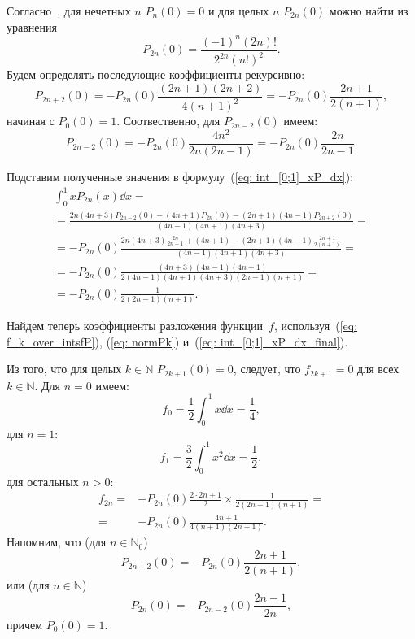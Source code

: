 	Согласно~\cite[ур-е 18]{LegendreRochester}, для нечетных $n$  $P_n(0)=0$ и для целых $n$ $P_{2n}(0)$ можно найти из уравнения
	\begin{equation} 
		P_{2n}(0) = \frac{{(-1)}^n (2n)!}{2^{2n}{(n!)}^2}.
	\end{equation}
Будем определять последующие коэффициенты рекурсивно:
	\begin{equation} 
	\label{eq: P_2n+2_recursively}
	P_{2n+2}(0) = - P_{2n}(0) \frac{(2n+1)(2n+2)}{4(n+1)^2} = - P_{2n}(0) \frac{2n+1}{2(n+1)},
	\end{equation}
	начиная с $P_{0}(0)=1$.
	Соотвественно, для 	$P_{2n-2}(0)$ имеем:
	\begin{equation} 
	P_{2n-2}(0) = - P_{2n}(0) \frac{4n^2}{2n(2n-1)} = - P_{2n}(0) \frac{2n}{2n-1} .
	\end{equation}
	
	Подставим полученные значения в формулу~(\ref{eq: int_[0;1]_xP_dx}):
	\begin{multline}	
	\label{eq: int_[0;1]_xP_dx_final}
		\int_{0}^{1}{x P_{2n} (x) \dd{x}} = \\ 
		= \frac{2n(4n+3)P_{2n-2}(0)-(4n+1)P_{2n}(0)-(2n+1)(4n-1)P_{2n+2}(0)}{(4n-1)(4n+1)(4n+3)} = \\
		= - P_{2n}(0) \frac{2n(4n+3)\frac{2n}{2n-1}+(4n+1)-(2n+1)(4n-1)\frac{2n+1}{2(n+1)}}{(4n-1)(4n+1)(4n+3)} = \\
		= -  P_{2n}(0) \frac{(4n+3)(4n-1)(4n+1)}{2(4n-1)(4n+1)(4n+3)(2n-1)(n+1)} = \\
		= -  P_{2n}(0) \frac{1}{2(2n-1)(n+1)}.
	\end{multline} 
	
	Найдем теперь коэффициенты разложения функции~$f$, используя~(\ref{eq: f_k_over_intsfP}), (\ref{eq: normPk}) и~(\ref{eq: int_[0;1]_xP_dx_final}). 
	
	Из того, что для целых $k \in \mathbb{N}$ $P_{2k+1}(0)=0$, следует, что $f_{2k+1}=0$ для всех $k \in \mathbb{N}$. Для $n=0$ имеем: 
	\begin{equation} 
	f_0 = \frac{1}{2}\int_{0}^{1}{x\dd{x}} = \frac{1}{4},
	\end{equation} 
	для $n=1$:
	\begin{equation} 
	f_1 = \frac{3}{2} \int_{0}^{1}{x^2\dd{x}} = \frac{1}{2},
	\end{equation} 
	 для остальных $n>0$:
	\begin{equation}
	\label{eq: f_n_simple} 
	\begin{split}
	f_{2n} =& -P_{2n}(0)\frac{2 \cdot 2n+1}{2}\times\frac{1}{2(2n-1)(n+1)} = \\ 
	  = &	-P_{2n}(0)\frac{4n+1}{4(n+1)(2n-1)}.
	\end{split}
	\end{equation}
	Напомним, что (для $n \in \mathbb{N}_0$)
	\begin{equation} 
	\label{eq: P_2n+2_recursively}
	P_{2n+2}(0) = - P_{2n}(0) \frac{2n+1}{2(n+1)},
	\end{equation} 
	или (для $n \in \mathbb{N}$)
	\begin{equation} 
	\label{eq: P_2n_recursively}
	P_{2n}(0) = - P_{2n-2}(0) \frac{2n-1}{2n}, 
	\end{equation}
	причем $P_{0}(0)=1$.
	
